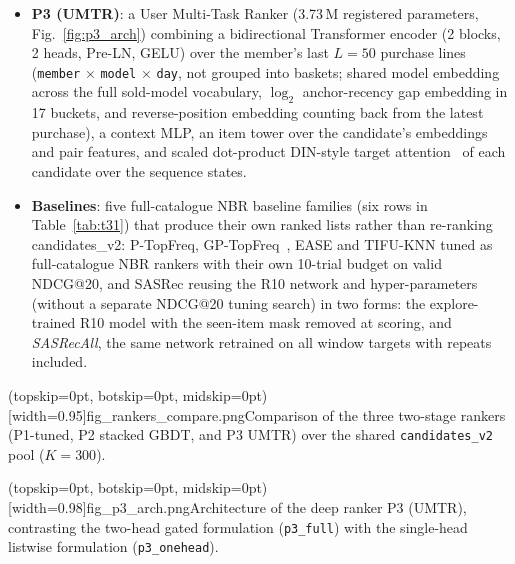 \documentclass{ieeeaccess}
\begin{document}
\begin{itemize}
\item \textbf{P3 (UMTR)}: a User Multi-Task Ranker (3.73\,M registered parameters, Fig.~\ref{fig:p3_arch}) combining a bidirectional Transformer encoder (2 blocks, 2 heads, Pre-LN, GELU) over the member's last $L=50$ purchase lines (\texttt{member} $\times$ \texttt{model} $\times$ \texttt{day}, not grouped into baskets; shared model embedding across the full sold-model vocabulary, $\log_2$ anchor-recency gap embedding in 17 buckets, and reverse-position embedding counting back from the latest purchase), a context MLP, an item tower over the candidate's embeddings and pair features, and scaled dot-product DIN-style target attention~\cite{zhou2018din} of each candidate over the sequence states.
\item \textbf{Baselines}: five full-catalogue NBR baseline families (six rows in Table~\ref{tab:t31}) that produce their own ranked lists rather than re-ranking candidates\_v2: P-TopFreq, GP-TopFreq~\cite{li2023nbr}, EASE and TIFU-KNN tuned as full-catalogue NBR rankers with their own
10-trial budget on valid NDCG@20, and SASRec reusing the R10 network and hyper-parameters (without a separate NDCG@20 tuning search) in two forms: the explore-trained R10 model with the seen-item mask removed at scoring, and \emph{SASRecAll}, the same network retrained on all window targets with repeats included.
\end{itemize}

\Figure[t!](topskip=0pt, botskip=0pt, midskip=0pt)[width=0.95\textwidth]{fig_rankers_compare.png}{Comparison of the three two-stage rankers (P1-tuned, P2 stacked GBDT, and P3 UMTR) over the shared \texttt{candidates\_v2} pool ($K=300$).\label{fig:rankers_compare}}

\Figure[t!](topskip=0pt, botskip=0pt, midskip=0pt)[width=0.98\textwidth]{fig_p3_arch.png}{Architecture of the deep ranker P3 (UMTR), contrasting the two-head gated formulation (\texttt{p3\_full}) with the single-head listwise formulation (\texttt{p3\_onehead}).\label{fig:p3_arch}}
\end{document}
